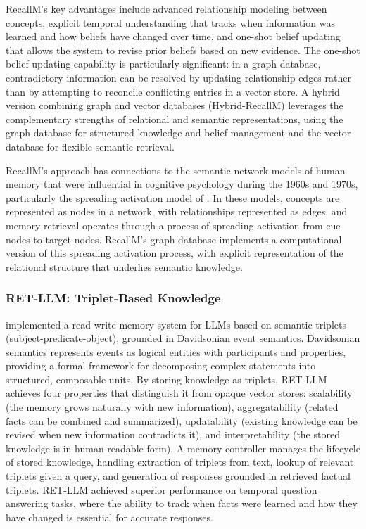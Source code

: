 RecallM's key advantages include advanced relationship modeling between concepts, explicit temporal understanding that tracks when information was learned and how beliefs have changed over time, and one-shot belief updating that allows the system to revise prior beliefs based on new evidence. The one-shot belief updating capability is particularly significant: in a graph database, contradictory information can be resolved by updating relationship edges rather than by attempting to reconcile conflicting entries in a vector store. A hybrid version combining graph and vector databases (Hybrid-RecallM) leverages the complementary strengths of relational and semantic representations, using the graph database for structured knowledge and belief management and the vector database for flexible semantic retrieval.

RecallM's approach has connections to the semantic network models of human memory that were influential in cognitive psychology during the 1960s and 1970s, particularly the spreading activation model of \citet{collins1975spreading}. In these models, concepts are represented as nodes in a network, with relationships represented as edges, and memory retrieval operates through a process of spreading activation from cue nodes to target nodes. RecallM's graph database implements a computational version of this spreading activation process, with explicit representation of the relational structure that underlies semantic knowledge.

\subsubsection{RET-LLM: Triplet-Based Knowledge}

\citet{modarressi2024retllm} implemented a read-write memory system for LLMs based on semantic triplets (subject-predicate-object), grounded in Davidsonian event semantics. Davidsonian semantics represents events as logical entities with participants and properties, providing a formal framework for decomposing complex statements into structured, composable units. By storing knowledge as triplets, RET-LLM achieves four properties that distinguish it from opaque vector stores: scalability (the memory grows naturally with new information), aggregatability (related facts can be combined and summarized), updatability (existing knowledge can be revised when new information contradicts it), and interpretability (the stored knowledge is in human-readable form). A memory controller manages the lifecycle of stored knowledge, handling extraction of triplets from text, lookup of relevant triplets given a query, and generation of responses grounded in retrieved factual triplets. RET-LLM achieved superior performance on temporal question answering tasks, where the ability to track when facts were learned and how they have changed is essential for accurate responses.

